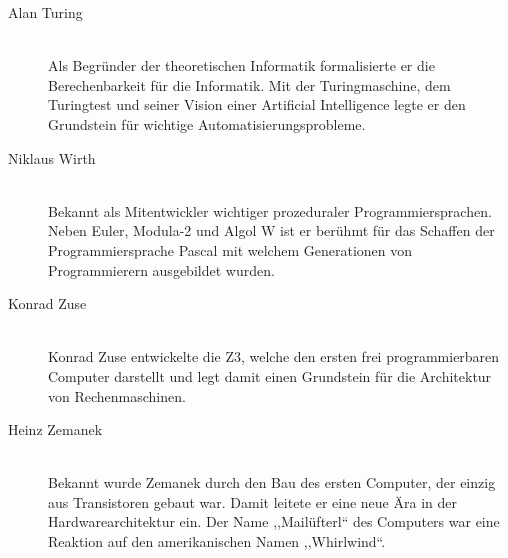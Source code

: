 \begin{description}
  \item[Alan Turing ] \hfill{} \\
    Als Begründer der theoretischen Informatik formalisierte er die Berechenbarkeit für die Informatik. Mit der Turingmaschine, dem Turingtest und seiner Vision einer Artificial Intelligence legte er den Grundstein für wichtige Automatisierungsprobleme.

  \item[Niklaus Wirth ] \hfill{} \\
    Bekannt als Mitentwickler wichtiger prozeduraler Programmiersprachen. Neben Euler, Modula-2 und Algol W ist er berühmt für das Schaffen der Programmiersprache Pascal mit welchem Generationen von Programmierern ausgebildet wurden.

  \item[Konrad Zuse ] \hfill{} \\
    Konrad Zuse entwickelte die Z3, welche den ersten frei programmierbaren Computer darstellt und legt damit einen Grundstein für die Architektur von Rechenmaschinen.

  \item[Heinz Zemanek ] \hfill{} \\
    Bekannt wurde Zemanek durch den Bau des ersten Computer, der einzig aus Transistoren gebaut war. Damit leitete er eine neue Ära in der Hardwarearchitektur ein. Der Name ,,Mailüfterl`` des Computers war eine Reaktion auf den amerikanischen Namen ,,Whirlwind``.
\end{description}
